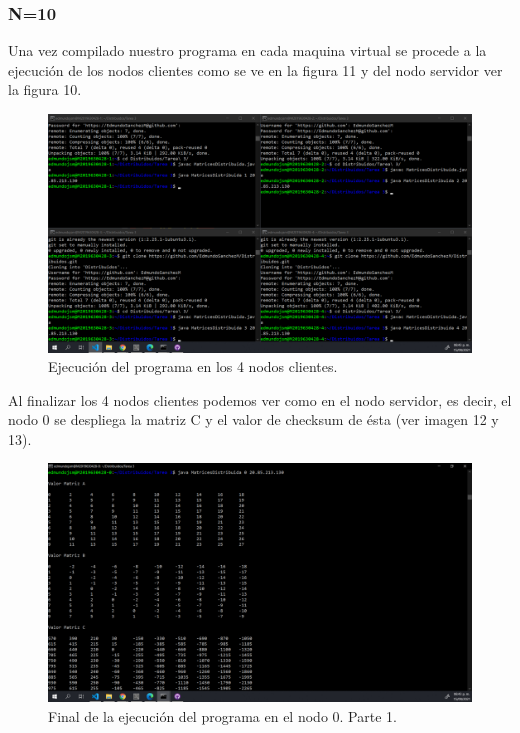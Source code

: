 \documentclass[11pt]{article}
\begin{document}
		\subsubsection{N=10}
		Una vez compilado nuestro programa en cada maquina virtual se procede a la ejecución de los nodos clientes como se ve en la figura 11 y del nodo servidor ver la figura 10.
		\begin{figure}[H]
			\centering
			\includegraphics[scale=0.34]{resources/ejecucionnodo1a4n10.png}
			\caption{Ejecución del programa en los 4 nodos clientes. }\label{fig:picture}
		\end{figure}
		Al finalizar los 4 nodos clientes podemos ver como en el nodo servidor, es decir, el nodo 0 se despliega la matriz C y el valor de checksum de ésta (ver imagen 12 y 13).
		\begin{figure}[H]
			\centering
			\includegraphics[scale=0.34]{resources/nodo0final1n10.png}
			\caption{Final de la ejecución del programa en el nodo 0. Parte 1.}\label{fig:picture}
		\end{figure}
\end{document}
